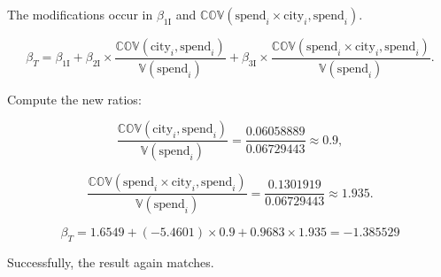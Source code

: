 \documentclass{article}
\newenvironment{colorparagraph}[1]{\par\color{#1}}{\par}
\begin{document}
The modifications occur in $\beta_{1 \text{I}}$ and $\mathbb{COV}(\text{spend}_i \times \text{city}_i, \text{spend}_i)$.

\[
\beta_T = \beta_{1 \text{I}} + \beta_{2 \text{I}} \times \frac{\mathbb{COV}(\text{city}_i, \text{spend}_i)}{\mathbb{V}(\text{spend}_i)} + \beta_{3 \text{I}} \times \frac{\mathbb{COV}(\text{spend}_i \times \text{city}_i, \text{spend}_i)}{\mathbb{V}(\text{spend}_i)}.
\]

Compute the new ratios:

\[
\frac{\mathbb{COV}(\text{city}_i, \text{spend}_i)}{\mathbb{V}(\text{spend}_i)} = \frac{0.06058889}{0.06729443} \approx 0.9,
\]

\[
\frac{\mathbb{COV}(\text{spend}_i \times \text{city}_i, \text{spend}_i)}{\mathbb{V}(\text{spend}_i)} = \frac{0.1301919}{0.06729443} \approx 1.935.
\]

\[
\beta_T = 1.6549 + (-5.4601) \times 0.9 + 0.9683 \times 1.935 = -1.385529
\]

Successfully, the result again matches.





\end{document}
